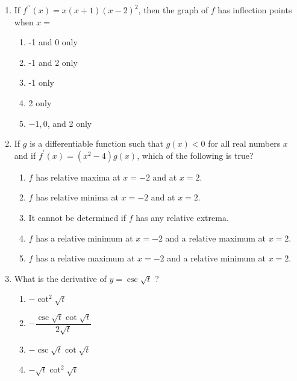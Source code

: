 \documentclass{article}
\begin{document}
\begin{enumerate}
	\item
	\begin{minipage}[t]{\linewidth}
		If \(f^{\prime \prime}(x)=x(x+1)(x-2)^{2}\), then the graph of \(f\) has
inflection points when \(x=\)
\vspace{1em}
		\begin{enumerate}
		\itemsep1em
			\item -1 and 0 only
			\item -1 and 2 only
			\item -1 only
			\item 2 only
			\item \(-1,0\), and 2 only
		\end{enumerate}
	\end{minipage}
	\item
	\begin{minipage}[t]{\linewidth}
		If \(g\) is a differentiable function such that \(g(x)<0\) for all real
numbers \(x\) and if \(f^{\prime}(x)=\left(x^{2}-4\right) g(x)\), which
of the following is true?
\vspace{1em}
		\begin{enumerate}
		\itemsep1em
			\item \({f}\) has relative maxima at \({x}=-2\) and at \({x}=2\).
			\item \({f}\) has relative minima at \({x}=-2\) and at \({x}=2\).
			\item It cannot be determined if \(f\) has any relative extrema.
			\item \({f}\) has a relative minimum at \({x}=-2\) and a relative maximum at
\({x}=2\).
			\item \({f}\) has a relative maximum at \({x}=-2\) and a relative minimum at
\({x}=2\).
		\end{enumerate}
	\end{minipage}
	\item
	\begin{minipage}[t]{\linewidth}
		What is the derivative of \({y}=\csc \sqrt{{t}}\) ?
\vspace{1em}
		\begin{enumerate}
		\itemsep1em
			\item \(-\cot ^{2} \sqrt{t}\)
			\item \(-\dfrac{\csc \sqrt{t} \cot \sqrt{t}}{2 \sqrt{t}}\)
			\item \(-\csc \sqrt{t} \cot \sqrt{t}\)
			\item \(-\sqrt{t} \cot ^{2} \sqrt{t}\)
		\end{enumerate}
	\end{minipage}

\end{enumerate}
\end{document}

